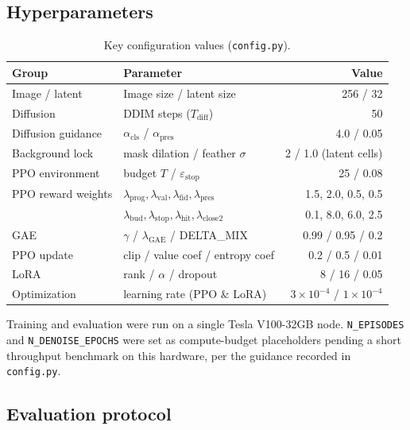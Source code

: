 \documentclass[11pt]{article}
\begin{document}
\subsection{Hyperparameters}

\begin{table}[h]
\centering
\caption{Key configuration values (\texttt{config.py}).}
\label{tab:hparams}
\begin{tabular}{@{}llr@{}}
\toprule
\textbf{Group} & \textbf{Parameter} & \textbf{Value} \\
\midrule
Image / latent      & Image size / latent size          & 256 / 32 \\
Diffusion           & DDIM steps ($T_{\text{diff}}$)     & 50 \\
Diffusion guidance  & $\alpha_{\text{cls}}$ / $\alpha_{\text{pres}}$ & 4.0 / 0.05 \\
Background lock     & mask dilation / feather $\sigma$   & 2 / 1.0 (latent cells) \\
PPO environment     & budget $T$ / $\varepsilon_{\text{stop}}$ & 25 / 0.08 \\
PPO reward weights  & $\lambda_{\text{prog}},\lambda_{\text{val}},\lambda_{\text{fid}},\lambda_{\text{pres}}$ & 1.5, 2.0, 0.5, 0.5 \\
                     & $\lambda_{\text{bud}},\lambda_{\text{stop}},\lambda_{\text{hit}},\lambda_{\text{close2}}$ & 0.1, 8.0, 6.0, 2.5 \\
GAE                  & $\gamma$ / $\lambda_{\text{GAE}}$ / DELTA\_MIX & 0.99 / 0.95 / 0.2 \\
PPO update           & clip / value coef / entropy coef  & 0.2 / 0.5 / 0.01 \\
LoRA                 & rank / $\alpha$ / dropout          & 8 / 16 / 0.05 \\
Optimization         & learning rate (PPO \& LoRA)        & $3\!\times\!10^{-4}$ / $1\!\times\!10^{-4}$ \\
\bottomrule
\end{tabular}
\end{table}

Training and evaluation were run on a single Tesla V100-32GB node.
\texttt{N\_EPISODES} and \texttt{N\_DENOISE\_EPOCHS} were set as
compute-budget placeholders pending a short throughput benchmark on this
hardware, per the guidance recorded in \texttt{config.py}.

\subsection{Evaluation protocol}
\end{document}
